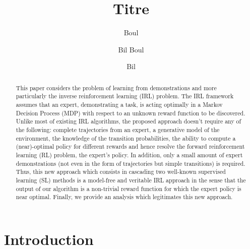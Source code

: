 \documentclass{llncs}
\newcommand{\0}{\mathbf{0}}
\newcommand{\1}{\mathbf{1}}
\begin{document}
\title{Titre}
\author{Boul \and Bil
Boul \and Bil}
\authorrunning{} %
%
\maketitle              %
\begin{abstract}
This paper considers the problem of learning from demonstrations and more particularly the inverse reinforcement learning (IRL) problem.
The IRL framework assumes that an expert, demonstrating a task, is acting optimally in a Markov Decision Process (MDP) with respect to an unknown reward function to be discovered.
Unlike most of existing IRL algorithms, the proposed approach doesn't require any of the following: complete trajectories from an expert, a generative model of the environment, the knowledge
of the transition probabilities, the ability to compute a (near)-optimal policy for different rewards and hence resolve the forward reinforcement learning (RL) problem, the expert's policy. In addition, only a small amount of expert demonstrations (not even in the form of trajectories but simple transitions) is required. Thus, this new approach which consists in cascading two well-known supervised learning (SL) methods is a model-free and veritable IRL approach in the sense that the output of our algorithm is a non-trivial reward function for which the expert policy is near optimal. Finally, we provide an analysis which legitimates this new approach.
\end{abstract}

\section{Introduction}
\end{document}
